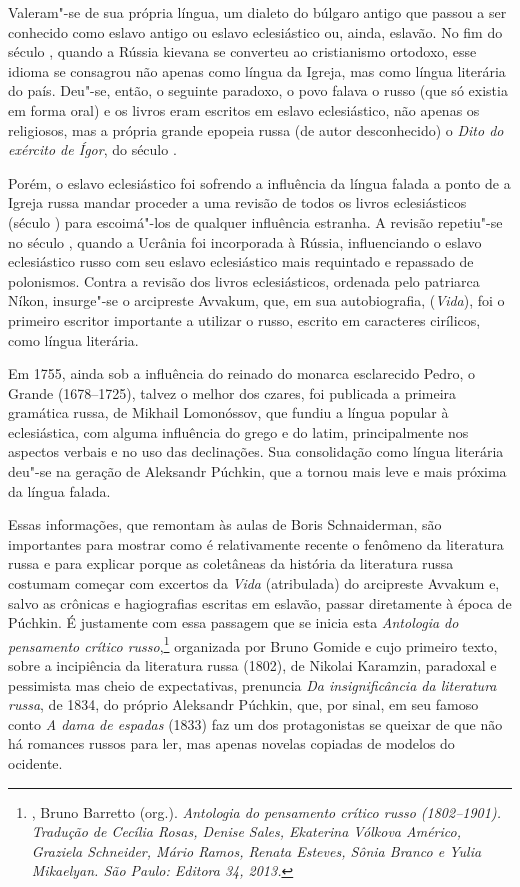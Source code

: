 {Valeram"-se de sua própria língua, um dialeto do búlgaro antigo que
passou a ser conhecido como eslavo antigo ou eslavo eclesiástico ou,
ainda, eslavão. No fim do século , quando a Rússia kievana se
converteu ao cristianismo ortodoxo, esse idioma se consagrou não apenas
como língua da Igreja, mas como língua literária do país. Deu"-se, então,
o seguinte paradoxo, o povo falava o russo (que só existia em forma
oral) e os livros eram
escritos em eslavo eclesiástico, não apenas os religiosos, mas a própria
grande epopeia russa (de autor desconhecido) o \emph{Dito do exército de
Ígor}, do século .

Porém, o eslavo eclesiástico foi sofrendo a influência da língua falada
a ponto de a Igreja russa mandar proceder a uma revisão de todos os
livros eclesiásticos (século ) para escoimá"-los de qualquer
influência estranha. A revisão repetiu"-se no século , quando a
Ucrânia foi incorporada à Rússia, influenciando o eslavo eclesiástico
russo com seu eslavo eclesiástico mais requintado e repassado de
polonismos. Contra a revisão dos livros eclesiásticos, ordenada pelo
patriarca Níkon, insurge"-se o arcipreste Avvakum, que, em sua
autobiografia, (\emph{Vida}), foi o primeiro escritor importante a
utilizar o russo, escrito em caracteres cirílicos, como língua literária.

Em 1755, ainda sob a influência do reinado do monarca esclarecido Pedro, o
Grande (1678--1725), talvez o melhor dos czares, foi publicada a primeira
gramática russa, de Mikhail Lomonóssov, que fundiu a língua popular à
eclesiástica, com alguma influência do grego e do latim,
 principalmente nos aspectos verbais e no uso das declinações. Sua
consolidação como língua literária deu"-se na geração de Aleksandr Púchkin, que a tornou mais leve e mais
próxima da língua falada.

Essas informações, que remontam às aulas de Boris Schnaiderman, são
importantes para mostrar como é relativamente recente o fenômeno da
literatura russa e para explicar porque as coletâneas da história
da literatura russa costumam começar com excertos da \emph{Vida} (atribulada) do arcipreste Avvakum e, salvo as crônicas e hagiografias
escritas em eslavão, passar diretamente à época de Púchkin. É
justamente com essa passagem que se inicia esta \emph{Antologia do
pensamento crítico russo},\footnote{, Bruno Barretto
 (org.). \emph{Antologia do pensamento crítico russo (1802--1901).
 Tradução de Cecília Rosas, Denise Sales, Ekaterina Vólkova Américo,
 Graziela Schneider, Mário Ramos, Renata Esteves, Sônia Branco e Yulia
 Mikaelyan. São Paulo: Editora 34, 2013.}} organizada por Bruno Gomide e cujo
primeiro texto, sobre a incipiência da literatura russa (1802), de
Nikolai Karamzin, paradoxal e pessimista mas cheio de expectativas,
prenuncia \emph{Da insignificância da literatura russa}, de 1834, do
próprio Aleksandr Púchkin, que, por sinal, em seu famoso conto \emph{A dama
de espadas} (1833) faz um dos protagonistas se queixar de que não há romances
russos para ler, mas apenas novelas copiadas de modelos do ocidente.

}
